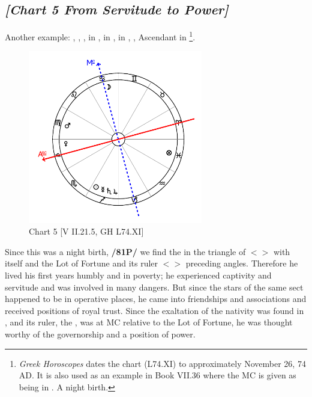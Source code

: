 \subsection*{\textit{[Chart 5 From Servitude to Power]}}

Another example: \Sun, \Mercury, \Saturn, \Jupiter\xspace in \Sagittarius, \Moon\xspace in \Cancer, \Mars\xspace in \Virgo,
\Venus, Ascendant in \Libra
\footnote{\textit{Greek Horoscopes} dates the chart (L74.XI) to approximately November 26, 74 AD. It is also used as an example in Book VII.36 where the MC is given as being in \Cancer. A night birth.}.

\clearpage
\begin{figure}
\centering
\vspace{-20pt}
\includegraphics[width=0.68\textwidth]{charts/2_21_5}
\caption{Chart 5 [V II.21.5, GH L74.XI]}
\label{fig:chart05}
\end{figure}

Since this was a night birth, \textbf{/81P/} we find the \Moon\xspace in the triangle of \Mars\xspace $<$\Cancer\xspace \Scorpio\xspace \Pisces$>$ with \Mars\xspace itself and the Lot of Fortune and its ruler $<$\Jupiter$>$ preceding angles.
Therefore he lived his first years humbly and in poverty; he experienced captivity and servitude and was involved in many dangers. But since the stars of the same sect happened to be in operative places, he came into friendships and associations and received positions of royal trust. Since the exaltation of the nativity was found in \Leo, and its ruler, the \Sun, was at MC relative to the Lot of Fortune, he was thought worthy of the governorship and a position of power.
\newpage

